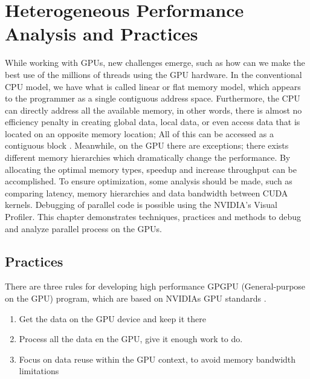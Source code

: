 \chapter{Heterogeneous Performance Analysis and Practices} %

\label{Heterogeneous Performance Analysis and Practices} %


While working with GPUs, new challenges emerge, such as how can we make the best use of the millions of threads using the GPU hardware. In the conventional CPU model, we have what is called linear or flat memory model, which appears to the programmer as a single contiguous address space. Furthermore, the CPU can directly address all the available memory, in other words, there is almost no efficiency penalty in creating global data, local data, or even access data that is located on an opposite memory location; All of this can be accessed as a contiguous block \cite{cook}. Meanwhile, on the GPU there are exceptions; there exists different memory hierarchies which dramatically change the performance. By allocating the optimal memory types, speedup and increase throughput can be accomplished. To ensure optimization, some analysis should be made, such as comparing latency, memory hierarchies and data bandwidth between CUDA kernels. Debugging of parallel code is possible  using the NVIDIA's Visual Profiler. This chapter demonstrates techniques, practices and methods to debug and analyze parallel process on the GPUs.

\section{Practices}

There are three rules for developing high performance GPGPU (General-purpose on the GPU) program, which are based on NVIDIAs GPU standards \cite{design}.

\begin{enumerate}
  \item Get the data on the GPU device and keep it there
  \item Process all the data en the GPU, give it enough work to do.
  \item Focus on data reuse within the GPU context, to avoid memory bandwidth limitations
\end{enumerate}

